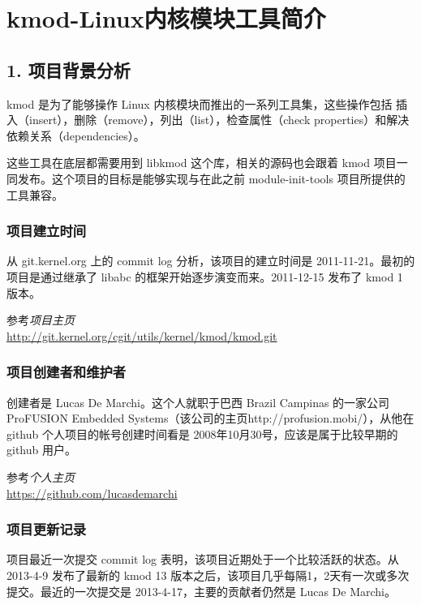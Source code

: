 \documentclass[11pt,a4paper]{article}
\begin{document}
\section{kmod-Linux内核模块工具简介}

\subsection{1. 项目背景分析}

kmod 是为了能够操作 Linux 内核模块而推出的一系列工具集，这些操作包括
插入（insert），删除（remove），列出（list），检查属性（check
properties）和解决依赖关系（dependencies）。

这些工具在底层都需要用到 libkmod 这个库，相关的源码也会跟着 kmod
项目一同发布。这个项目的目标是能够实现与在此之前 module-init-tools
项目所提供的工具兼容。

\subsubsection{项目建立时间}

从 git.kernel.org 上的 commit log 分析，该项目的建立时间是
2011-11-21。最初的项目是通过继承了 libabc
的框架开始逐步演变而来。2011-12-15 发布了 kmod 1 版本。

参考\emph{项目主页}\\\url{http://git.kernel.org/cgit/utils/kernel/kmod/kmod.git}

\subsubsection{项目创建者和维护者}

创建者是 Lucas De Marchi。这个人就职于巴西 Brazil Campinas
的一家公司ProFUSION Embedded
Systems（该公司的主页http://profusion.mobi/），从他在 github
个人项目的帐号创建时间看是 2008年10月30号，应该是属于比较早期的 github
用户。

参考\emph{个人主页}\\\url{https://github.com/lucasdemarchi}

\subsubsection{项目更新记录}

项目最近一次提交 commit log 表明，该项目近期处于一个比较活跃的状态。从
2013-4-9 发布了最新的 kmod 13
版本之后，该项目几乎每隔1，2天有一次或多次提交。最近的一次提交是
2013-4-17，主要的贡献者仍然是 Lucas De Marchi。
\end{document}
